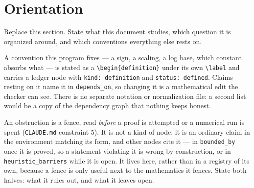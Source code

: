 \documentclass[../main.tex]{subfiles}
\begin{document}
\section{Orientation}
\label{sec:overview}

Replace this section. State what this document studies, which question it is
organized around, and which conventions everything else rests on.

A convention this program fixes --- a sign, a scaling, a log base, which constant
absorbs what --- is stated as a \texttt{\textbackslash begin\{definition\}} under its
own \texttt{\textbackslash label} and carries a ledger node with
\texttt{kind: definition} and \texttt{status: defined}. Claims resting on it name it
in \texttt{depends\_on}, so changing it is a mathematical edit the checker can see.
There is no separate notation or normalization file: a second list would be a copy of
the dependency graph that nothing keeps honest.

An obstruction is a fence, read \emph{before} a proof is attempted or a numerical run
is spent (\texttt{CLAUDE.md} constraint 5). It is not a kind of node: it is an ordinary
claim in the environment matching its form, and other nodes cite it --- in
\texttt{bounded\_by} once it is proved, so a statement violating it is wrong by
construction, or in \texttt{heuristic\_barriers} while it is open. It lives here, rather
than in a registry of its own, because a fence is only useful next to the mathematics
it fences. State both halves: what it rules out, and what it leaves open.
\end{document}
